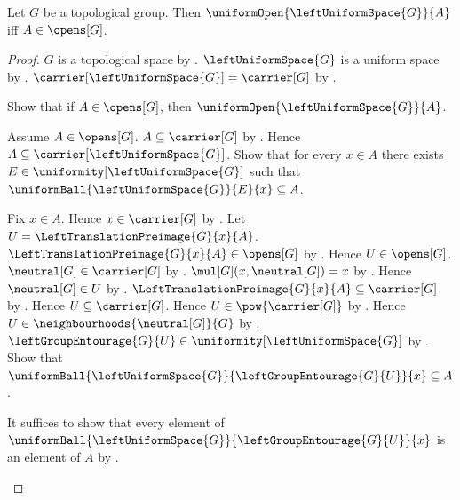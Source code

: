 \begin{theorem}\label{left_uniform_open_iff_topological_group_open}
    Let $G$ be a topological group.
    Then $\uniformOpen{\leftUniformSpace{G}}{A}$ iff $A\in\opens[G]$.
\end{theorem}
\begin{proof}
    $G$ is a topological space
        by .
    $\leftUniformSpace{G}$ is a uniform space
        by .
    $\carrier[\leftUniformSpace{G}]=\carrier[G]$
        by .

    Show that if $A\in\opens[G]$, then
        $\uniformOpen{\leftUniformSpace{G}}{A}$.
    \begin{subproof}
        Assume $A\in\opens[G]$.
        $A\subseteq\carrier[G]$ by .
        Hence $A\subseteq\carrier[\leftUniformSpace{G}]$.
        Show that for every $x\in A$ there exists
            $E\in\uniformity[\leftUniformSpace{G}]$ such that
            $\uniformBall{\leftUniformSpace{G}}{E}{x}\subseteq A$.
        \begin{subproof}
            Fix $x\in A$.
            Hence $x\in\carrier[G]$ by .
            Let $U=\LeftTranslationPreimage{G}{x}{A}$.
            $\LeftTranslationPreimage{G}{x}{A}\in\opens[G]$
                by .
            Hence $U\in\opens[G]$.
            $\neutral[G]\in\carrier[G]$ by .
            $\mul[G](x,\neutral[G])=x$ by .
            Hence $\neutral[G]\in U$
                by .
            $\LeftTranslationPreimage{G}{x}{A}\subseteq\carrier[G]$
                by .
            Hence $U\subseteq\carrier[G]$.
            Hence $U\in\pow{\carrier[G]}$ by .
            Hence $U\in\neighbourhoods{\neutral[G]}{G}$
                by .
            $\leftGroupEntourage{G}{U}
                \in\uniformity[\leftUniformSpace{G}]$
                by .
            Show that $\uniformBall{\leftUniformSpace{G}}
                {\leftGroupEntourage{G}{U}}{x}\subseteq A$.
            \begin{subproof}
                It suffices to show that every element of
                    $\uniformBall{\leftUniformSpace{G}}
                        {\leftGroupEntourage{G}{U}}{x}$
                    is an element of $A$ by .

\end{subproof}
\end{subproof}
\end{subproof}
\end{proof}
